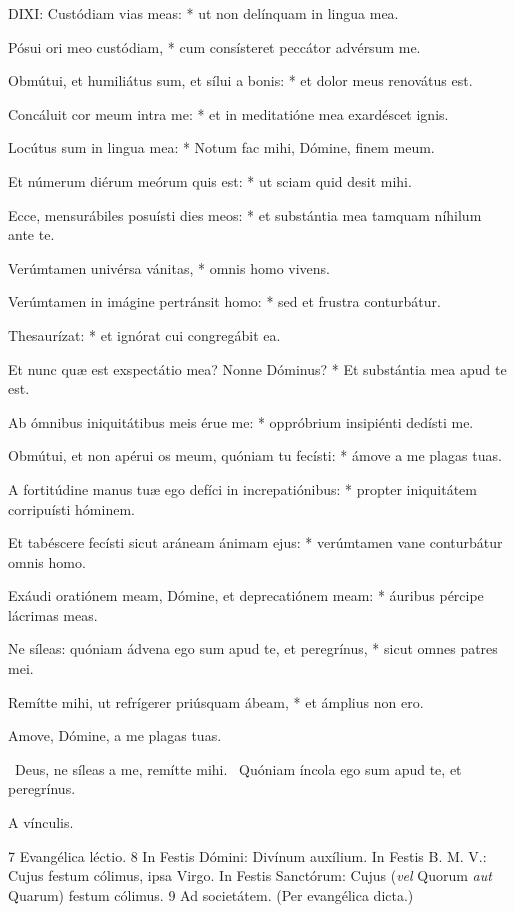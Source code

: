 \lettrine[lines=2]{D}{IXI}: Custódiam vias meas: * ut non delínquam in lingua mea.

Pósui ori meo custódiam, * cum consísteret peccátor advérsum me.

Obmútui, et humiliátus sum, et sílui a bonis: * et dolor meus renovátus est.

Concáluit cor meum intra me: * et in meditatióne mea exardéscet ignis.

Locútus sum in lingua mea: * Notum fac mihi, Dómine, finem meum.

Et númerum diérum meórum quis est: * ut sciam quid desit mihi.

Ecce, mensurábiles posuísti dies meos: * et substántia mea tamquam níhilum ante te.

Verúmtamen univérsa vánitas, * omnis homo vivens.

Verúmtamen in imágine pertránsit homo: * sed et frustra conturbátur.

Thesaurízat: * et ignórat cui congregábit ea.

Et nunc quæ est exspectátio mea? Nonne Dóminus? * Et substántia mea apud te est.

Ab ómnibus iniquitátibus meis érue me: * oppróbrium insipiénti dedísti me.

Obmútui, et non apérui os meum, quóniam tu fecísti: * ámove a me plagas tuas.

A fortitúdine manus tuæ ego defíci in increpatiónibus: * propter iniquitátem corripuísti hóminem.

Et tabéscere fecísti sicut aráneam ánimam ejus: * verúmtamen vane conturbátur omnis homo.

Exáudi oratiónem meam, Dómine, et deprecatiónem meam: * áuribus pércipe lácrimas meas.

Ne síleas: quóniam ádvena ego sum apud te, et peregrínus, * sicut omnes patres mei.

Remítte mihi, ut refrígerer priúsquam ábeam, * et ámplius non ero.

 Amove, Dómine, a me plagas tuas.


\V\ Deus, ne síleas a me, remítte mihi. \R\ Quóniam íncola ego sum apud te, et peregrínus.


 A vínculis.

 7 Evangélica léctio. 8 In Festis Dómini: Divínum auxílium. In Festis B. M. V.: Cujus festum cólimus, ipsa Virgo. In Festis Sanctórum: Cujus (\textit{vel} Quorum \textit{aut} Quarum) festum cólimus. 9 Ad societátem. (Per evangélica dicta.)

